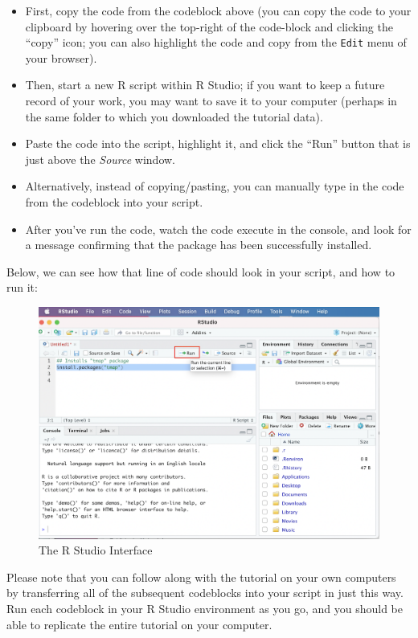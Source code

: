 \documentclass[
]{article}
\providecommand{\tightlist}{%
  \setlength{\itemsep}{0pt}\setlength{\parskip}{0pt}}
\begin{document}
\begin{itemize}
\tightlist
\item
  First, copy the code from the codeblock above (you can copy the code to your clipboard by hovering over the top-right of the code-block and clicking the ``copy'' icon; you can also highlight the code and copy from the \texttt{Edit} menu of your browser).
\item
  Then, start a new R script within R Studio; if you want to keep a future record of your work, you may want to save it to your computer (perhaps in the same folder to which you downloaded the tutorial data).
\item
  Paste the code into the script, highlight it, and click the ``Run'' button that is just above the \emph{Source} window.
\item
  Alternatively, instead of copying/pasting, you can manually type in the code from the codeblock into your script.
\item
  After you've run the code, watch the code execute in the console, and look for a message confirming that the package has been successfully installed.
\end{itemize}

Below, we can see how that line of code should look in your script, and how to run it:

\begin{figure}
\includegraphics[width=1\linewidth]{images/script} \caption{The R Studio Interface}\label{fig:unnamed-chunk-3}
\end{figure}

Please note that you can follow along with the tutorial on your own computers by transferring all of the subsequent codeblocks into your script in just this way. Run each codeblock in your R Studio environment as you go, and you should be able to replicate the entire tutorial on your computer.
\end{document}
